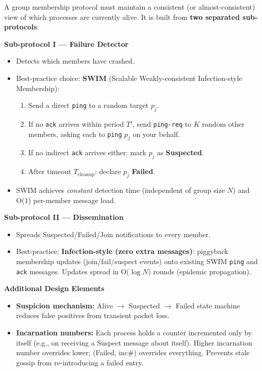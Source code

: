 \documentclass[12pt,a4paper]{article}
\begin{document}
\begin{solbox}
A group membership protocol must maintain a consistent (or almost-consistent) view of
which processes are currently alive. It is built from \textbf{two separated sub-protocols}:

\medskip
\textbf{Sub-protocol I — Failure Detector}
\begin{itemize}
  \item Detects which members have crashed.
  \item Best-practice choice: \textbf{SWIM} (Scalable Weakly-consistent Infection-style
        Membership):
        \begin{enumerate}
          \item Send a direct \texttt{ping} to a random target $p_j$.
          \item If no \texttt{ack} arrives within period $T'$, send \texttt{ping-req}
                to $K$ random other members, asking each to \texttt{ping} $p_j$ on
                your behalf.
          \item If no indirect \texttt{ack} arrives either: mark $p_j$ as
                \textbf{Suspected}.
          \item After timeout $T_{\text{cleanup}}$: declare $p_j$ \textbf{Failed}.
        \end{enumerate}
  \item SWIM achieves \emph{constant} detection time (independent of group size $N$)
        and O(1) per-member message load.
\end{itemize}

\medskip
\textbf{Sub-protocol II — Dissemination}
\begin{itemize}
  \item Spreads Suspected/Failed/Join notifications to every member.
  \item Best-practice: \textbf{Infection-style (zero extra messages)}:
        piggyback membership updates (join/fail/suspect events) onto existing
        SWIM \texttt{ping} and \texttt{ack} messages.
        Updates spread in O($\log N$) rounds (epidemic propagation).
\end{itemize}

\medskip
\textbf{Additional Design Elements}
\begin{itemize}
  \item \textbf{Suspicion mechanism:}
        Alive $\to$ Suspected $\to$ Failed state machine reduces false positives from
        transient packet loss.
  \item \textbf{Incarnation numbers:}
        Each process holds a counter incremented only by itself (e.g., on receiving a
        Suspect message about itself).
        Higher incarnation number overrides lower; (Failed, inc\#) overrides everything.
        Prevents stale gossip from re-introducing a failed entry.
\end{itemize}
\end{solbox}
\end{document}
